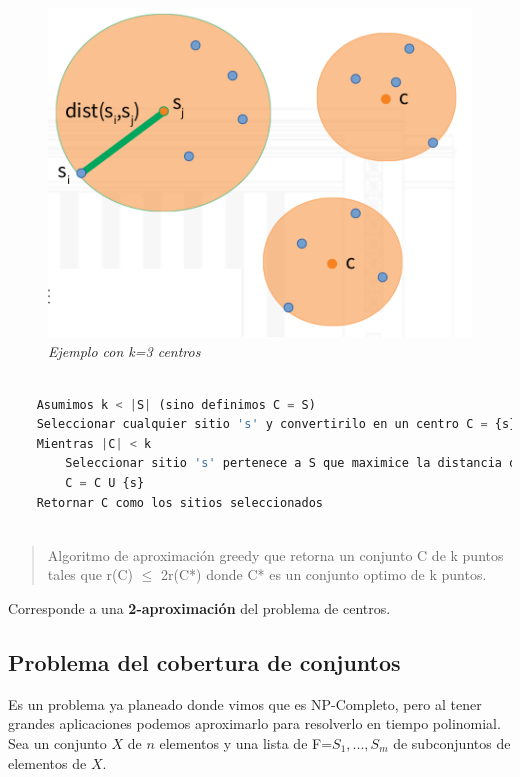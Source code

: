 \documentclass{article}
\begin{document}
\begin{figure}[h!]
    \begin{center} 
    \includegraphics[width=\linewidth]{imagenes/problema-aproximacion-centros.png}
    \caption{\small \sl Ejemplo con k=3 centros} 
    \end{center}
\end{figure}

\begin{lstlisting}[language=Python, caption=Algoritmo de aproximación greedy]
    
    Asumimos k < |S| (sino definimos C = S)
    Seleccionar cualquier sitio 's' y convertirilo en un centro C = {s} 
    Mientras |C| < k
        Seleccionar sitio 's' pertenece a S que maximice la distancia dist(s,C)
        C = C U {s}
    Retornar C como los sitios seleccionados
    
\end{lstlisting}    

\begin{quote}
    Algoritmo de aproximación greedy que retorna un conjunto C de k puntos tales que r(C) \( \leq \) 2r(C*) donde C* es un conjunto optimo de k puntos.
\end{quote}

Corresponde a una \textbf{2-aproximación} del problema de centros.

\newpage
\subsection{Problema del cobertura de conjuntos}
Es un problema ya planeado donde vimos que es NP-Completo, pero al tener grandes aplicaciones podemos
aproximarlo para resolverlo en tiempo polinomial.
Sea un conjunto \(X\) de \(n\) elementos y una lista de F={\(S_1,...,S_m\)} de subconjuntos de elementos de \(X\).
\end{document}
